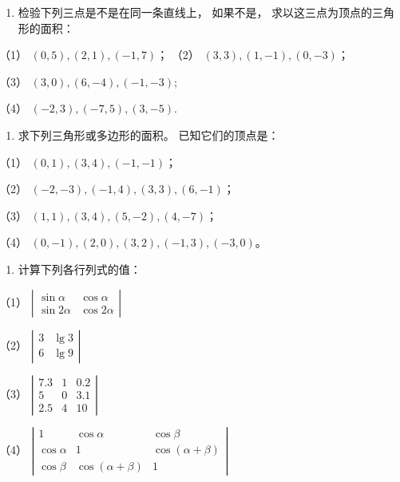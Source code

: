 \begin{enumerate}
\def\labelenumi{\arabic{enumi}.}
\tightlist
\item
  检验下列三点是不是在同一条直线上， 如果不是，
  求以这三点为顶点的三角形的面积：
\end{enumerate}

（1） \((0,5),(2,1),(-1,7)\)； （2） \((3,3),(1,-1),(0,-3)\)；

（3） \((3,0),(6, - 4),(-1, - 3);\)

（4） \((-2,3),(-7,5),(3,-5).\)

\begin{enumerate}
\def\labelenumi{\arabic{enumi}.}
\setcounter{enumi}{1}
\tightlist
\item
  求下列三角形或多边形的面积。 已知它们的顶点是：
\end{enumerate}

（1） \((0, 1), (3, 4), (-1, -1)\)；

（2） \((-2, -3), (-1, 4), (3, 3), (6, -1)\)；

（3） \((1, 1), (3, 4), (5, -2), (4, -7)\)；

（4） \((0, -1), (2, 0), (3, 2), (-1, 3), (-3, 0)\)。

\begin{enumerate}
\def\labelenumi{\arabic{enumi}.}
\tightlist
\item
  计算下列各行列式的值：
\end{enumerate}

（1）
\(\left| \begin{array}{cc}\sin \alpha & \cos \alpha \\ \sin 2\alpha & \cos 2\alpha \end{array} \right|\)

（2）
\(\left| \begin{array}{cc}3 & \lg 3\\ 6 & \lg 9 \end{array} \right|\)

（3）
\(\left| \begin{array}{ccc}7.3 & 1 & 0.2\\ 5 & 0 & 3.1\\ 2.5 & 4 & 10 \end{array} \right|\)

（4）
\(\left| \begin{array}{ccc}1 & \cos \alpha & \cos \beta \\ \cos \alpha & 1 & \cos (\alpha +\beta) \\ \cos \beta & \cos (\alpha +\beta) & 1 \end{array} \right|\)

